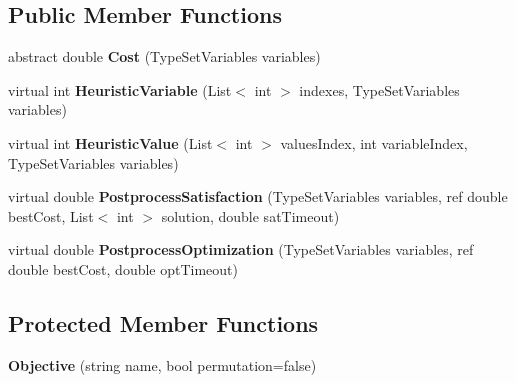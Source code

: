 \subsection*{Public Member Functions}
\begin{DoxyCompactItemize}
\item 
\hypertarget{classghost_1_1Objective_3_01TypeSetVariables_00_01TypeVariable_01_4_a0c12ac631a5d034441c8192597b018e3}{abstract double {\bfseries Cost} (Type\-Set\-Variables variables)}\label{classghost_1_1Objective_3_01TypeSetVariables_00_01TypeVariable_01_4_a0c12ac631a5d034441c8192597b018e3}

\item 
\hypertarget{classghost_1_1Objective_3_01TypeSetVariables_00_01TypeVariable_01_4_a64c523482c82c5fcbffa31a0a57aeb48}{virtual int {\bfseries Heuristic\-Variable} (List$<$ int $>$ indexes, Type\-Set\-Variables variables)}\label{classghost_1_1Objective_3_01TypeSetVariables_00_01TypeVariable_01_4_a64c523482c82c5fcbffa31a0a57aeb48}

\item 
\hypertarget{classghost_1_1Objective_3_01TypeSetVariables_00_01TypeVariable_01_4_ababf3021752413ec655afb785d140627}{virtual int {\bfseries Heuristic\-Value} (List$<$ int $>$ values\-Index, int variable\-Index, Type\-Set\-Variables variables)}\label{classghost_1_1Objective_3_01TypeSetVariables_00_01TypeVariable_01_4_ababf3021752413ec655afb785d140627}

\item 
\hypertarget{classghost_1_1Objective_3_01TypeSetVariables_00_01TypeVariable_01_4_acc3900b803f6e1ada95c1e4b5a8f0857}{virtual double {\bfseries Postprocess\-Satisfaction} (Type\-Set\-Variables variables, ref double best\-Cost, List$<$ int $>$ solution, double sat\-Timeout)}\label{classghost_1_1Objective_3_01TypeSetVariables_00_01TypeVariable_01_4_acc3900b803f6e1ada95c1e4b5a8f0857}

\item 
\hypertarget{classghost_1_1Objective_3_01TypeSetVariables_00_01TypeVariable_01_4_a699f37da4873761f4b3c9721f140c56a}{virtual double {\bfseries Postprocess\-Optimization} (Type\-Set\-Variables variables, ref double best\-Cost, double opt\-Timeout)}\label{classghost_1_1Objective_3_01TypeSetVariables_00_01TypeVariable_01_4_a699f37da4873761f4b3c9721f140c56a}

\end{DoxyCompactItemize}
\subsection*{Protected Member Functions}
\begin{DoxyCompactItemize}
\item 
\hypertarget{classghost_1_1Objective_3_01TypeSetVariables_00_01TypeVariable_01_4_a036b0e1d3b3678f38f5080a1a32e27f4}{{\bfseries Objective} (string name, bool permutation=false)}\label{classghost_1_1Objective_3_01TypeSetVariables_00_01TypeVariable_01_4_a036b0e1d3b3678f38f5080a1a32e27f4}

\end{DoxyCompactItemize}
